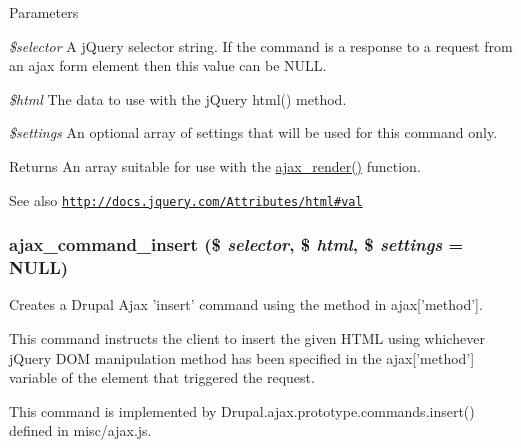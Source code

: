 \begin{DoxyParams}{Parameters}
\item[{\em \$selector}]A jQuery selector string. If the command is a response to a request from an ajax form element then this value can be NULL. \item[{\em \$html}]The data to use with the jQuery html() method. \item[{\em \$settings}]An optional array of settings that will be used for this command only.\end{DoxyParams}
\begin{DoxyReturn}{Returns}
An array suitable for use with the \hyperlink{group__ajax_ga241c2426bdde049c55b05b7bf5d714a2}{ajax\_\-render()} function.
\end{DoxyReturn}
\begin{DoxySeeAlso}{See also}
\href{http://docs.jquery.com/Attributes/html#val}{\tt http://docs.jquery.com/Attributes/html\#val} 
\end{DoxySeeAlso}
\hypertarget{group__ajax__commands_ga6c3bb9fd1958e286e6e1330c182952a1}{
\subsubsection[{ajax\_\-command\_\-insert}]{\setlength{\rightskip}{0pt plus 5cm}ajax\_\-command\_\-insert (\$ {\em selector}, \/  \$ {\em html}, \/  \$ {\em settings} = {\ttfamily NULL})}}
\label{group__ajax__commands_ga6c3bb9fd1958e286e6e1330c182952a1}
Creates a Drupal Ajax 'insert' command using the method in ajax\mbox{[}'method'\mbox{]}.

This command instructs the client to insert the given HTML using whichever jQuery DOM manipulation method has been specified in the ajax\mbox{[}'method'\mbox{]} variable of the element that triggered the request.

This command is implemented by Drupal.ajax.prototype.commands.insert() defined in misc/ajax.js.


